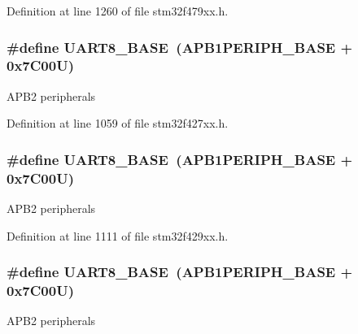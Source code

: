 Definition at line 1260 of file stm32f479xx.\+h.

\subsubsection[{\texorpdfstring{U\+A\+R\+T8\+\_\+\+B\+A\+SE}{UART8_BASE}}]{\setlength{\rightskip}{0pt plus 5cm}\#define U\+A\+R\+T8\+\_\+\+B\+A\+SE~({\bf A\+P\+B1\+P\+E\+R\+I\+P\+H\+\_\+\+B\+A\+SE} + 0x7\+C00\+U)}\hypertarget{group___peripheral__memory__map_gac9c6cd59a248941d9d2462ab21a2346e}{}\label{group___peripheral__memory__map_gac9c6cd59a248941d9d2462ab21a2346e}
A\+P\+B2 peripherals 

Definition at line 1059 of file stm32f427xx.\+h.

\subsubsection[{\texorpdfstring{U\+A\+R\+T8\+\_\+\+B\+A\+SE}{UART8_BASE}}]{\setlength{\rightskip}{0pt plus 5cm}\#define U\+A\+R\+T8\+\_\+\+B\+A\+SE~({\bf A\+P\+B1\+P\+E\+R\+I\+P\+H\+\_\+\+B\+A\+SE} + 0x7\+C00\+U)}\hypertarget{group___peripheral__memory__map_gac9c6cd59a248941d9d2462ab21a2346e}{}\label{group___peripheral__memory__map_gac9c6cd59a248941d9d2462ab21a2346e}
A\+P\+B2 peripherals 

Definition at line 1111 of file stm32f429xx.\+h.

\subsubsection[{\texorpdfstring{U\+A\+R\+T8\+\_\+\+B\+A\+SE}{UART8_BASE}}]{\setlength{\rightskip}{0pt plus 5cm}\#define U\+A\+R\+T8\+\_\+\+B\+A\+SE~({\bf A\+P\+B1\+P\+E\+R\+I\+P\+H\+\_\+\+B\+A\+SE} + 0x7\+C00\+U)}\hypertarget{group___peripheral__memory__map_gac9c6cd59a248941d9d2462ab21a2346e}{}\label{group___peripheral__memory__map_gac9c6cd59a248941d9d2462ab21a2346e}
A\+P\+B2 peripherals 

